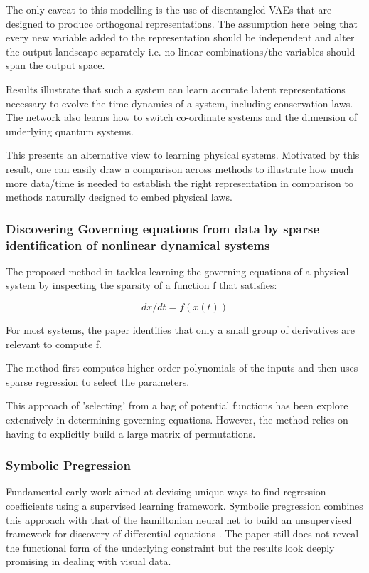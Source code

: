\documentclass{article}
\begin{document}
The only caveat to this modelling is the use of disentangled VAEs that are designed to produce orthogonal representations. The assumption here being that every new variable added to the representation should be independent and alter the output landscape separately i.e. no linear combinations/the variables should span the output space.

Results illustrate that such a system can learn accurate latent representations necessary to evolve the time dynamics of a system, including conservation laws. The network also learns how to switch co-ordinate systems and the dimension of underlying quantum systems. 

This presents an alternative view to learning physical systems. Motivated by this result, one can easily draw a comparison across methods to illustrate how much more data/time is needed to establish the right representation in comparison to methods naturally designed to embed physical laws. 

\subsubsection{Discovering Governing equations from data by sparse identification of nonlinear dynamical systems}

 The proposed method in \cite{brunton_discovering_2016} tackles learning the governing equations of a physical system by inspecting the sparsity of a function f that satisfies:
 
 $$ d x/dt = f(x(t)) $$
 
 For most systems, the paper identifies that only a small group of derivatives are relevant to compute f. 
 
 The method first computes higher order polynomials of the inputs and then uses sparse regression to select the parameters. 
 
 This approach of 'selecting' from a bag of potential functions has been explore extensively in determining governing equations. However, the method relies on having to explicitly build a large matrix of permutations. 

\subsubsection{Symbolic Pregression}

Fundamental early work aimed at devising unique ways to find regression coefficients using a supervised learning framework. Symbolic pregression combines this approach with that of the hamiltonian neural net to build an unsupervised framework for discovery of differential equations \cite{udrescu_symbolic_2020}. The paper still does not reveal the functional form of the underlying constraint but the results look deeply promising in dealing with visual data.
\end{document}
